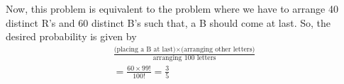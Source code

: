 Now, this problem is equivalent to the problem where we have to arrange 40 distinct R's and 60 distinct B's such that, a B should come at last. So,
the desired probability is given by 
\begin{multline}
\frac{\text{(placing a B at last)} \times \text{(arranging other letters)}}{\text{arranging 100 letters}} \\  = \frac{60 \times 99! }{100!}
 = \frac{3}{5} \label{cond/2/Eq:4}
\end{multline}
